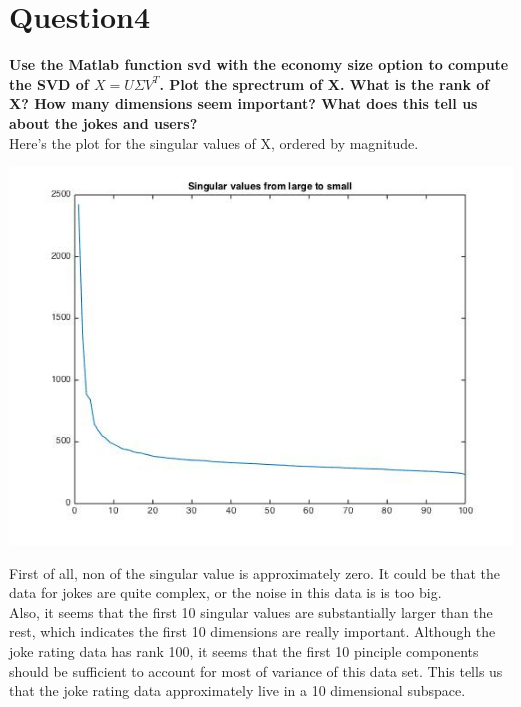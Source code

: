 \documentclass[paper=a4, fontsize=11pt]{scrartcl} %
\numberwithin{equation}{section} %
\numberwithin{figure}{section} %
\numberwithin{table}{section} %
\begin{document}
\newpage
\section*{Question4}
\textbf{Use the Matlab function svd with the economy size option to compute the SVD of $X = U \Sigma V^T $. Plot the sprectrum of X. What is the rank of X? How many dimensions seem important? What does this tell us about the jokes and users?}\\

Here's the plot for the singular values of X, ordered by magnitude.
\begin{center}
\includegraphics[scale=.6]{4_sv.jpg}
\end{center}

First of all, non of the singular value is approximately zero. It could be that the data for jokes are quite complex, or the noise in this data is is too big. \\

Also, it seems that the first 10 singular values are substantially larger than the rest, which indicates the first 10 dimensions are really important. Although the joke rating data has rank 100, it seems that the first 10 pinciple components should be sufficient to account for most of variance of this data set. This tells us that the joke rating data approximately live in a 10 dimensional subspace. \\
\end{document}
